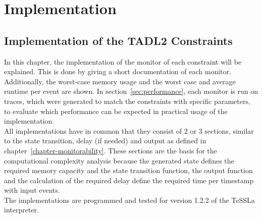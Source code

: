 
\chapter{Implementation}
\label{chapter-implementation}
	\section{Implementation of the TADL2 Constraints}
	In this chapter, the implementation of the monitor of each constraint will be explained. This is done by giving a short documentation of each monitor. Additionally, the worst-case memory usage and the worst case and average runtime per event are shown. In section~\ref{sec:performance}, each monitor is run on traces, which were generated to match the constraints with specific parameters, to evaluate which performance can be expected in practical usage of the implementation.\\
	All implementations have in common that they consist of 2 or 3 sections, similar to the state transition, delay (if needed) and output as defined in chapter~\ref{chapter-monitorability}. These sections are the basis for the computational complexity analysis because the generated state defines the required memory capacity and the state transition function, the output function and the calculation of the required delay define the required time per timestamp with input events.\\
	The implementations are programmed and tested for version 1.2.2 of the TeSSLa interpreter.
